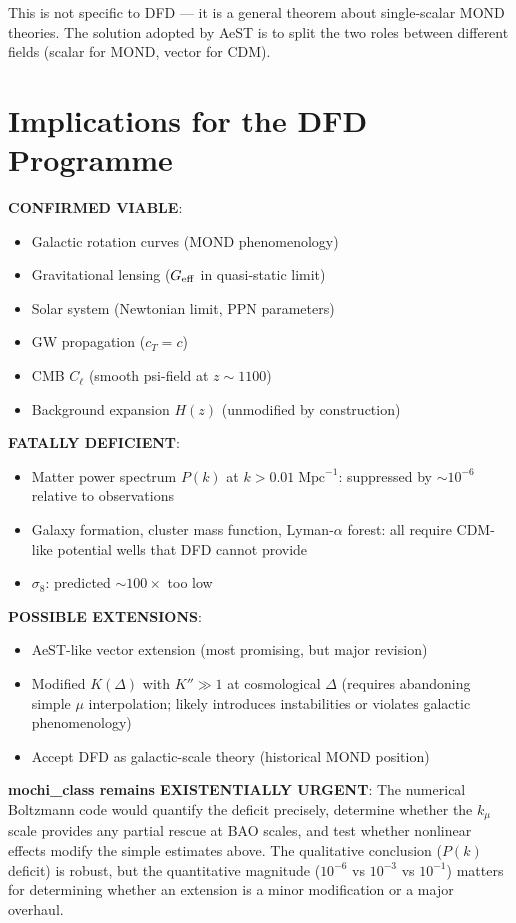 \documentclass[11pt]{article}
\newcommand{\Geff}{G_{\rm eff}}
\begin{document}
This is not specific to DFD --- it is a general theorem about
single-scalar MOND theories. The solution adopted by AeST is to
split the two roles between different fields (scalar for MOND,
vector for CDM).

\section{Implications for the DFD Programme}

\begin{tcolorbox}[colback=red!5!white, colframe=red!70!black,
  title=\textbf{COSMOLOGICAL STATUS OF DFD (Post-i18)}]

\textbf{CONFIRMED VIABLE}:
\begin{itemize}[nosep]
\item Galactic rotation curves (MOND phenomenology)
\item Gravitational lensing ($\Geff$ in quasi-static limit)
\item Solar system (Newtonian limit, PPN parameters)
\item GW propagation ($c_T = c$)
\item CMB $C_\ell$ (smooth psi-field at $z \sim 1100$)
\item Background expansion $H(z)$ (unmodified by construction)
\end{itemize}

\textbf{FATALLY DEFICIENT}:
\begin{itemize}[nosep]
\item Matter power spectrum $P(k)$ at $k > 0.01\;\text{Mpc}^{-1}$:
  suppressed by $\sim 10^{-6}$ relative to observations
\item Galaxy formation, cluster mass function, Lyman-$\alpha$ forest:
  all require CDM-like potential wells that DFD cannot provide
\item $\sigma_8$: predicted $\sim 100\times$ too low
\end{itemize}

\textbf{POSSIBLE EXTENSIONS}:
\begin{itemize}[nosep]
\item AeST-like vector extension (most promising, but major revision)
\item Modified $K(\Delta)$ with $K'' \gg 1$ at cosmological $\Delta$
  (requires abandoning simple $\mu$ interpolation; likely introduces
  instabilities or violates galactic phenomenology)
\item Accept DFD as galactic-scale theory (historical MOND position)
\end{itemize}

\textbf{mochi\_class remains EXISTENTIALLY URGENT}: The numerical
Boltzmann code would quantify the deficit precisely, determine
whether the $k_\mu$ scale provides any partial rescue at BAO
scales, and test whether nonlinear effects modify the simple
estimates above. The qualitative conclusion ($P(k)$ deficit) is
robust, but the quantitative magnitude ($10^{-6}$ vs $10^{-3}$
vs $10^{-1}$) matters for determining whether an extension is
a minor modification or a major overhaul.

\end{tcolorbox}
\end{document}
